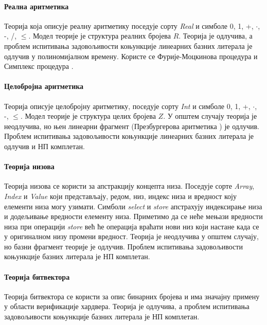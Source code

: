 \documentclass[a4paper]{article}
\begin{document}
\paragraph{Реална аритметика} Теорија која описује реалну аритметику поседује сорту \emph{Real} и симболе
0, 1, +, $\cdot$, -, /, $\leq$. Модел теорије је структура реалних бројева $R$. Теорија је одлучива,
а проблем испитивања задовољивости коњункције линеарних базних литерала је одлучив у полиномијалном времену.
Користе се Фурије-Моцкинова процедура \cite{handbookar} и Симплекс процедура \cite{lp}.

\paragraph{Целобројна аритметика} Теорија описује целобројну аритметику, поседује сорту \emph{Int} и симболе
0, 1, +, $\cdot$, -, $\leq$. Модел теорије је структура целих бројева $Z$. У општем случају теорија је
неодлучива, но њен линеарни фрагмент (Презбургерова аритметика \cite{handbookar}) је одлучив. Проблем испитивања
задовољивости коњункције линеарних базних литерала је одлучив и НП комплетан.

\paragraph{Теорија низова} Теорија низова се користи за апстракцију концепта низа. Поседује сорте
\emph{Array}, \emph{Index} и \emph{Value} који представљају, редом, низ, индекс низа и вредност коју елементи
низа могу узимати. Симболи \emph{select} и \emph{store} апстрахују индексирање низа и додељивање вредности
елементу низа. Приметимо да се неће мењази вредности низа при операцији \emph{store} већ ће операција
враћати нови низ који настане када се у оригиналном низу промени вредност.
Теорија је неодлучива у општем случају, но базни фрагмент теорије је одлучив. Проблем испитивања
задовољивости коњункције базних литерала је НП комплетан.

\paragraph{Теорија битвектора} Теорија битвектора се користи за опис бинарних бројева и има значајну примену
у области верификације хардвера. Теорија је одлучива, а проблем испитивања задовољивости коњункције базних
литерала је НП комплетан.

\end{document}
